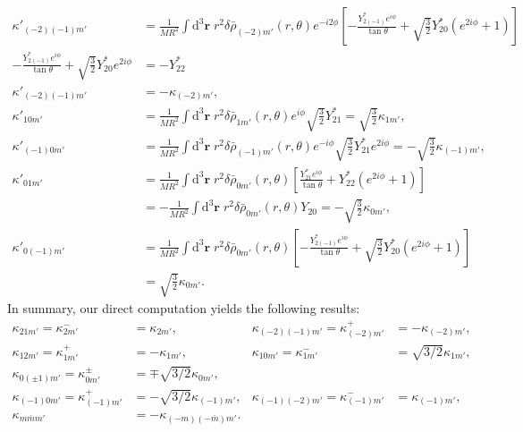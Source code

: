 \documentclass[12pt]{article}
\newcommand*{\bm}[1]{\boldsymbol{\mathbf{#1}}}
\newcommand*{\p}[1]{\left(#1\right)}
\newcommand*{\s}[1]{\left[#1\right]}
\begin{document}
\begin{align}
    \kappa'_{(-2)(-1)m'}
        &=
            \frac{1}{MR^2}
            \int\limits\mathrm{d}^3 \bm{r}\;
            r^2
            \delta \bar{\rho}_{(-2)m'}(r, \theta)
            e^{-i2\phi}
            \s{-\frac{Y_{2(-1)}^* e^{i\phi}}{\tan\theta}
                + \sqrt{\frac{3}{2}}Y_{20}^* \p{e^{2i\phi} + 1}}\nonumber\\
    -\frac{Y_{2(-1)}^* e^{i\phi}}{\tan\theta}
            + \sqrt{\frac{3}{2}}Y_{20}^* e^{2i\phi}
        &= - Y_{22}^*\nonumber\\
    \kappa'_{(-2)(-1)m'} &= -\kappa_{(-2)m'},\\
    \kappa'_{10m'}
        &=
            \frac{1}{MR^2}
            \int\limits\mathrm{d}^3 \bm{r}\;
            r^2
            \delta \bar{\rho}_{1m'}(r, \theta)
            e^{i\phi}
            \sqrt{\frac{3}{2}}Y_{21}^* = \sqrt{\frac{3}{2}}\kappa_{1m'},\\
    \kappa'_{(-1)0m'}
        &=
            \frac{1}{MR^2}
            \int\limits\mathrm{d}^3 \bm{r}\;
            r^2
            \delta \bar{\rho}_{(-1)m'}(r, \theta)
            e^{-i\phi}
            \sqrt{\frac{3}{2}}Y_{21}^*e^{2i\phi}
                = -\sqrt{\frac{3}{2}} \kappa_{(-1)m'},\\
    \kappa'_{01m'}
        &=
            \frac{1}{MR^2}
            \int\limits\mathrm{d}^3 \bm{r}\;
            r^2
            \delta \bar{\rho}_{0m'}(r, \theta)
            \s{\frac{Y_{21}^* e^{i\phi}}{\tan\theta}
                + Y_{22}^* \p{e^{2i\phi} + 1}}\nonumber\\
        &=
            -\frac{1}{MR^2}
            \int\limits\mathrm{d}^3 \bm{r}\;
            r^2
            \delta \bar{\rho}_{0m'}(r, \theta)
            Y_{20} = -\sqrt{\frac{3}{2}}\kappa_{0m'},\\
    \kappa'_{0(-1)m'}
        &=
            \frac{1}{MR^2}
            \int\limits\mathrm{d}^3 \bm{r}\;
            r^2
            \delta \bar{\rho}_{0m'}(r, \theta)
            \s{-\frac{Y_{2(-1)}^* e^{i\phi}}{\tan\theta}
                + \sqrt{\frac{3}{2}}Y_{20}^* \p{e^{2i\phi} + 1}}\nonumber\\
        &= \sqrt{\frac{3}{2}}\kappa_{0m'}.
\end{align}
In summary, our direct computation yields the following results:
\begin{align}
    \kappa_{21m'} = \kappa_{2m'}^- &= \kappa_{2m'}, &
    \kappa_{(-2)(-1)m'} = \kappa_{(-2)m'}^+ &= -\kappa_{(-2)m'}, \nonumber\\
    \kappa_{12m'} = \kappa_{1m'}^+ &= -\kappa_{1m'}, &
    \kappa_{10m'} = \kappa_{1m'}^- &= \sqrt{3/2}\kappa_{1m'}, \nonumber\\
    \kappa_{0(\pm 1)m'} = \kappa_{0m'}^{\pm} &= \mp \sqrt{3/2}\kappa_{0m'}, \nonumber\\
    \kappa_{(-1)0m'} = \kappa_{(-1)m'}^+ &= -\sqrt{3/2}\kappa_{(-1)m'}, &
    \kappa_{(-1)(-2)m'} = \kappa_{(-1)m'}^- &= \kappa_{(-1)m'},\\
    \kappa_{m\bar{m}m'} &= -\kappa_{(-m)(-\bar{m})m'}.
\end{align}
\end{document}

